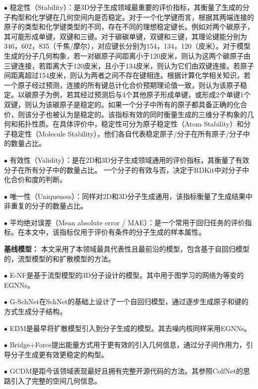 $\bullet$ 稳定性（Stability）：是3D分子生成领域最重要的评价指标，其衡量了生成的分子构型和化学键在几何空间内是否稳定。对于一个化学键而言，根据其两端连接的原子的类型和化学键类型的不同，存在不同的理想稳定键长。例如对两个碳原子，其可能形成单键，双键和三键。对于碳碳单键，双键和三键，其理论键能分别为346，602，835（千焦/摩尔），对应键长分别为154，134，120（皮米）。对于模型生成的分子几何构象，若一对碳原子间距离小于120皮米，则认为这两个碳原子由三键连接，若距离大于120皮米，且小于134皮米，则认为它们由双键连接。若原子间距离超过154皮米，则认为两者之间不存在键相连。根据计算化学相关知识，若一个原子经过预测，连接的所有键总计化合价预期理论值一致，则认为该原子稳定。以碳原子为例，若其经过预测后与4个其他原子形成单键，或形成2个单键1个双键，则认为该碳原子是稳定的。如果一个分子中所有的原子都具备正确的化合价，则该分子也被认为是稳定的。该指标有效的同时衡量生成的三维分子构象的几何和拓扑性质。在具体评价中，稳定性可分为原子稳定性（Atom Stability）和分子稳定性（Molecule Stability），他们各自代表稳定原子/分子在所有原子/分子中的数量占比。

$\bullet$ 有效性（Validity）：是在2D和3D分子生成领域通用的评价指标，其衡量了有效分子在所有分子中的数量占比。 一个分子的有效与否，决定于RDKit中对分子中化合价和度的判断。

$\bullet$ 唯一性（Uniqueness）：同样对2D和3D分子生成通用，该指标衡量了生成结果中非重复的分子的数量占比。

$\bullet$ 平均绝对误差（Mean absolute error / MAE）：是一个常用于回归任务的评价指标。在本文中，该指标仅用于评价有条件的分子生成的样本属性。

\textbf{基线模型：}
本文采用了本领域最具代表性且最前沿的模型，包含基于自回归模型的，流型模型的和扩散模型的方法。

$\bullet$ E-NF\cite{enf_satorras_21}是基于流型模型的3D分子设计的模型。其中用于图学习的网络为等变的EGNNs\cite{egnn_satorras_21}。

$\bullet$ G-SchNet\cite{gschnet_wallach_19}在SchNet\cite{schnet_schutt_17}的基础上设计了一个自回归模型，通过逐步生成原子和键的方式生成分子结构。

$\bullet$ EDM\cite{edm_hoogeboom_22}是最早将扩散模型引入到分子生成的模型。其去噪内核同样采用EGNNs\cite{egnn_satorras_21}。

$\bullet$ Bridge+Force\cite{diffpg_wu_22}提出能量方式用于更有效的引入几何信息，通过分子间作用力，引导分子生成更有效更稳定的构型。

$\bullet$ GCDM\cite{gcdm_morehead_23}是距今该领域表现最好且拥有完整开源代码的方法。其参照ColfNet的思路\cite{colfnet_du_22}引入了完整的空间几何信息。

